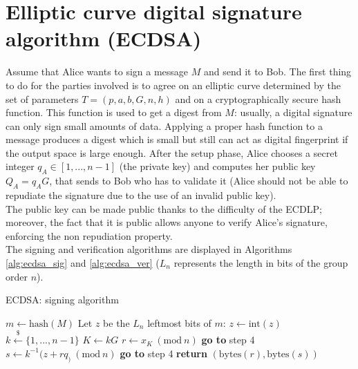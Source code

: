 \bigskip

\section{Elliptic curve digital signature algorithm (ECDSA)}
\label{ecdsa}
Assume that Alice wants to sign a message $M$ and send it to Bob. The first thing to do for the parties involved is to agree on an elliptic curve determined by the set of parameters $T = (p, a, b, G, n, h)$ and on a cryptographically secure hash function. This function is used to get a digest from $M$: usually, a digital signature can only sign small amounts of data. Applying a proper hash function to a message produces a digest which is small but still can act as digital fingerprint if the output space is large enough. After the setup phase, Alice chooses a secret integer $q_A \in [1, ..., n - 1]$ (the private key) and computes her public key $Q_A = q_AG$, that sends to Bob who has to validate it (Alice should not be able to repudiate the signature due to the use of an invalid public key). 
\\
The public key can be made public thanks to the difficulty of the ECDLP; moreover, the fact that it is public allows anyone to verify Alice's signature, enforcing the non repudiation property.
\\
The signing and verification algorithms are displayed in Algorithms \ref{alg:ecdsa_sig} and \ref{alg:ecdsa_ver} ($L_n$ represents the length in bits of the group order $n$).

\bigskip

\begin{algorithm}
	\caption{ECDSA: signing algorithm}
	\label{alg:ecdsa_sig}
	\begin{algorithmic}[1]
		\State $m \gets \text{hash}(M)$
		\State Let $z$ be the $L_n$ leftmost bits of $m$: $z \gets \text{int}(z)$
		\State $k \xleftarrow{\text{\$}} \{1, ..., n - 1\}$
		\State $K \gets kG$
		\State $r \gets x_K \ (\text{mod} \ n)$
		\State \textbf{go to} step 4
		\EndIf 
		\State $s \gets k^{-1}(z + rq_) \ (\text{mod} \ n)$
		\State \textbf{go to} step 4
		\EndIf
		\State \textbf{return} $(\text{bytes}(r), \text{bytes}(s))$
		\EndProcedure
	\end{algorithmic}
\end{algorithm}

\bigskip


